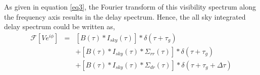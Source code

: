 \documentclass[12pt,preprint]{aastex}
\begin{document}
As given in equation \ref{eq3}, the Fourier transform of this visibility spectrum along the frequency axis results in the delay spectrum. Hence, the all sky integrated delay spectrum could be written as, 
%
\begin{eqnarray}			
\mathcal{F} \left [V e^{i\phi}\right] & = & \left [ B(\tau)\ast I_{sky}(\tau) \right ]\ast \delta(\tau+\tau_{g}) \nonumber\\
		&& +  \left [ B(\tau)\ast I_{sky}(\tau)* \Sigma_{rr}( \tau) \right ]\ast \delta(\tau+\tau_{g}) \nonumber\\
		&& +  \left [B(\tau)\ast I_{sky}(\tau)* \Sigma_{dr}( \tau) \right ]\ast \delta(\tau+\tau_{g}+ \Delta \tau)\nonumber\\
\label{eq10}
\end{eqnarray}
\end{document}
